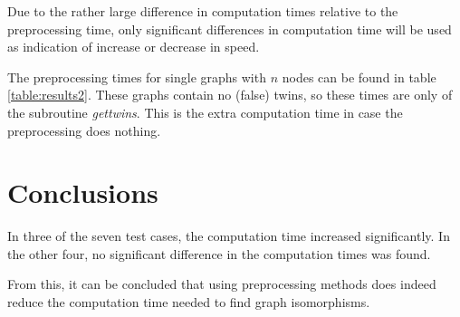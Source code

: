 \documentclass[twoside]{article}
\theoremstyle{definition}
\theoremstyle{plain}
\begin{document}
\begin{multicols}{2}
Due to the rather large difference in computation times relative to the preprocessing time, only significant differences in computation time will be used as indication of increase or decrease in speed.

The preprocessing times for single graphs with $n$ nodes can be found in table \ref{table:results2}. These graphs contain no (false) twins, so these times are  only of the subroutine \emph{gettwins}. This is the extra computation time in case the preprocessing does nothing. 

\section{Conclusions}

In three of the seven test cases, the computation time increased significantly. In the other four, no significant difference in the computation times was found.

From this, it can be concluded that using preprocessing methods does indeed reduce the computation time needed to find graph isomorphisms.


\printbibliography




\end{multicols}
\end{document}
